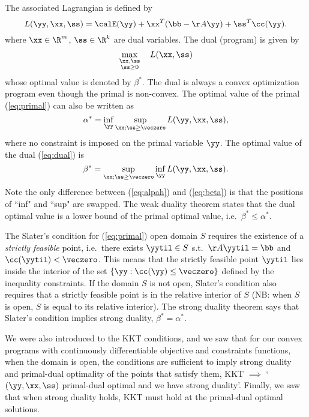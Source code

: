 The associated Lagrangian is defined by
\[
  L(\yy, \xx, \ss) = \calE(\yy) + \xx^T(\bb-\AA\yy) + \ss^T\cc(\yy).
\]
where $\xx \in \R^m$, $\ss \in \R^k$ are dual variables. The dual (program) is given by
\begin{equation}
  \label{eq:dual}
  \max_{\substack{\xx, \ss \\ \ss \geq 0}} \quad L(\xx,  \ss)
\end{equation}
whose optimal value is denoted by $\beta^*$. The dual is always a convex optimization program even though the primal is non-convex.
The optimal value of the primal (\ref{eq:primal}) can also be written as
\begin{equation}\label{eq:alpah}
  \alpha^* = \inf_{\yy} \sup_{\xx; \ss\geq\veczero} L(\yy, \xx, \ss),
\end{equation}
where no constraint is imposed on the primal variable $\yy$.
The optimal value of the dual (\ref{eq:dual}) is
\begin{equation}\label{eq:beta}
  \beta^* = \sup_{\xx; \ss\geq\veczero} \inf_{\yy} L(\yy, \xx, \ss).
\end{equation}
Note the only difference between (\ref{eq:alpah}) and (\ref{eq:beta}) is that the positions of ``inf" and ``sup" are swapped.
The weak duality theorem states that the dual optimal value is a lower bound of the primal optimal value, i.e.\ $\beta^* \leq \alpha^*$.

The Slater's condition for (\ref{eq:primal}) open domain $S$ requires the existence of a \emph{strictly feasible} point, i.e.\ there exists $\yytil\in S$ s.t.\ $\AA\yytil = \bb$ and $\cc(\yytil) < \veczero$.
This means that the strictly feasible point $\yytil$ lies inside the
interior of the set $\{\yy : \cc(\yy) \leq \veczero\}$ defined by the
inequality constraints.
If the domain $S$ is not open, Slater's condition also requires that a
strictly feasible point is in the relative interior of $S$ (NB:
when $S$ is open, $S$ is equal to its relative interior).
The strong duality theorem says that Slater's condition implies strong
duality, $\beta^* = \alpha^*$.

We were also introduced to the KKT conditions, and we saw that for our
convex programs with continuously differentiable objective and
constraints functions, when the domain is open, the conditions are sufficient to
imply strong duality and primal-dual optimality of the points that
satisfy them, KKT $\implies$ `$(\yy,\xx,\ss)$ primal-dual optimal and
we have strong duality'.
Finally, we saw that when strong duality holds,
KKT must hold at the
primal-dual optimal solutions.

